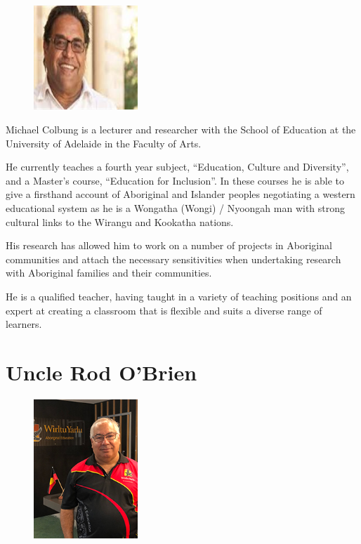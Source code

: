 \documentclass[twoside,12pt,a4paper,notitlepage]{memoir}
\begin{document}
\begin{figure}
\centering
\includegraphics[width=0.35\textwidth]{michael_colbung.jpeg}
\end{figure}

Michael Colbung is a lecturer and researcher with the School of Education at the University of Adelaide in the Faculty of Arts. 

He currently teaches a fourth year subject, “Education, Culture and Diversity”, and a Master’s course, “Education for Inclusion”. In these courses he is able to give a firsthand account of Aboriginal and Islander peoples negotiating a western educational system as he is a Wongatha (Wongi) / Nyoongah man with strong cultural links to the Wirangu and Kookatha nations.

His research has allowed him to work on a number of projects in Aboriginal communities and attach the necessary sensitivities when undertaking research with Aboriginal families and their communities.

He is a qualified teacher, having taught in a variety of teaching positions and an expert at creating a classroom that is flexible and suits a diverse range of learners.
\vfill


\clearpage{}
\vspace*{2cm}
\section*{Uncle Rod O'Brien}

\begin{figure}
\centering
\includegraphics[width=0.35\textwidth]{Uncle_Rod.jpg}
\end{figure}
\end{document}
